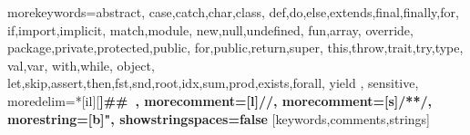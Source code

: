 

%
{morekeywords={abstract,%
  case,catch,char,class,%
  def,do,else,extends,final,finally,for,%
  if,import,implicit,%
  match,module,%
  new,null,undefined,%
  fun,array,
  override,%
  package,private,protected,public,%
  for,public,return,super,%
  this,throw,trait,try,type,%
  val,var,%
  with,while,%
  object,
  let,skip,assert,then,fst,snd,root,idx,sum,prod,exists,forall,%
  yield%
  },%
  sensitive,%
  moredelim=*[il][\bfseries]{\#\#\ },
  morecomment=[l]//,%
  morecomment=[s]{/*}{*/},%
  morestring=[b]",%
  showstringspaces=false%
}[keywords,comments,strings]%



\newcommand{\commentstyle}[1]{\color{ccomment}\itshape{#1}}
\newcommand{\keywordstyle}[1]{\color{ckeyword}{#1}}
\newcommand{\stringstyle}[1]{\color{cstring}\bfseries{#1}}


\newcommand{\code}[1]{\lstinline[language=Scala,columns=fixed,basicstyle=\ttfamily]|#1|}


\newcommand{\IMP}[0]{\texttt{IMP}}
\newcommand{\FUN}[0]{\texttt{FUN}}

\newcommand{\TOOL}[0]{\texttt{SIGMA}}



\newenvironment{sitemize}{
\begin{itemize}[leftmargin=2.5ex]
  \setlength{\itemsep}{1pt}
  \setlength{\parskip}{0pt}
  \setlength{\parsep}{0pt}
}{\end{itemize}}

